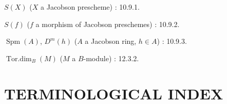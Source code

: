 $S(X)$ ($X$ a Jacobson prescheme) : 10.9.1.

$S(f)$ ($f$ a morphism of Jacobson preschemes) : 10.9.2.

$\operatorname{Spm}(A)$, $D^m(h)$ ($A$ a Jacobson ring, $h\in A$) : 10.9.3.

$\operatorname{Tor.dim}_B(M)$ ($M$ a $B$-module) : 12.3.2.

\endgroup

\clearpage
{}
{}
\section*{TERMINOLOGICAL INDEX}

\begingroup
\footnotesize
\setlength{\parindent}{0pt}
\setlength{\parskip}{1.1pt}
\newcommand{\EGAIVthreeTerm}[2]{#1 : #2.\par}

